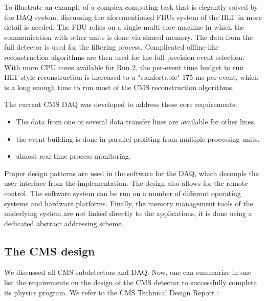 \begin{normalsize}
To illustrate an example of a complex computing task that is elegantly solved by the DAQ system, discussing the aforementioned FBUs system of the HLT in more detail is needed. The FBU relies on a single multi-core machine in which the communication with other units is done via shared memory. The data from the full detector is used for the filtering process. Complicated offline-like reconstruction algorithms are then used for the full precision event selection. With more CPU cores available for Run 2, the per-event time budget to run HLT-style reconstruction is increased to a "comfortable" 175 ms per event, which is a long enough time to run most of the CMS reconstruction algorithms. 

The current CMS DAQ was developed to address these core requirements: 

\begin{itemize}
\item The data from one or several data transfer lines are available for other lines,
\item the event building is done in parallel profiting from multiple processing units,
\item almost real-time process monitoring.
\end{itemize}


Proper design patterns are used in the software for the DAQ, which decouple the user  interface from the implementation. The design also allows for the remote control. The  software  system  can be run on a number of different  operating  systems  and  hardware  platforms.   Finally, the memory  management  tools  of  the  underlying  system  are not linked directly to the applications, it is done using a dedicated abstract addressing  scheme.

  
\subsection{The CMS design}

We discussed all CMS subdetectors and DAQ. Now, one can summarize in one list the requirements on the design of the CMS detector to successfully complete its physics program. We refer to the CMS Technical Design Report \cite{CMS_TDR}: 


\end{normalsize}
